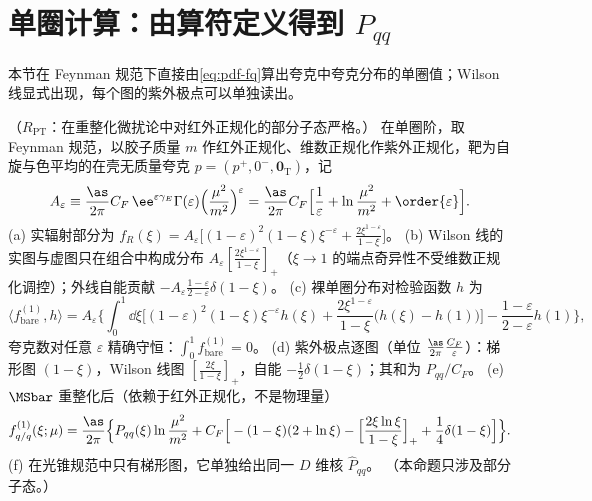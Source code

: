 \section{单圈计算：由算符定义得到 $P_{qq}$}\label{sec:pdf-oneloop}

本节在 Feynman 规范下直接由\cref{eq:pdf-fq}算出夸克中夸克分布的单圈值；Wilson 线显式出现，每个图的紫外极点可以单独读出。

\begin{proposition}\label{prop:pdf-pqq-operator}
（$R_{\mathrm{PT}}$：在重整化微扰论中对红外正规化的部分子态严格。）
在单圈阶，取 Feynman 规范，以胶子质量 $m$ 作红外正规化、维数正规化作紫外正规化，靶为自旋与色平均的在壳无质量夸克 $p=(p^+,0^-,\bm 0_{\mathrm T})$，记
\begin{equation}\label{eq:pdf-Aeps}
A_\varepsilon\equiv\frac{\as}{2\pi}C_F\,\ee^{\varepsilon\gamma_E}\Gamma(\varepsilon)\Big(\frac{\mu^2}{m^2}\Big)^{\varepsilon}=\frac{\as}{2\pi}C_F\Big[\frac1\varepsilon+\ln\frac{\mu^2}{m^2}+\order{\varepsilon}\Big].
\end{equation}
(a) 实辐射部分为 $f_R(\xi)=A_\varepsilon\big[(1-\varepsilon)^2(1-\xi)\xi^{-\varepsilon}+\frac{2\xi^{1-\varepsilon}}{1-\xi}\big]$。
(b) Wilson 线的实图与虚图只在组合中构成分布 $A_\varepsilon[\frac{2\xi^{1-\varepsilon}}{1-\xi}]_+$（$\xi\to1$ 的端点奇异性不受维数正规化调控）；外线自能贡献 $-A_\varepsilon\frac{1-\varepsilon}{2-\varepsilon}\delta(1-\xi)$。
(c) 裸单圈分布对检验函数 $h$ 为
\begin{equation}\label{eq:pdf-bare1}
\langle f^{(1)}_{\mathrm{bare}},h\rangle=A_\varepsilon\Big\{\int_0^1\!\dd\xi\Big[(1-\varepsilon)^2(1-\xi)\xi^{-\varepsilon}h(\xi)+\frac{2\xi^{1-\varepsilon}}{1-\xi}\big(h(\xi)-h(1)\big)\Big]-\frac{1-\varepsilon}{2-\varepsilon}h(1)\Big\},
\end{equation}
夸克数对任意 $\varepsilon$ 精确守恒：$\int_0^1f^{(1)}_{\mathrm{bare}}=0$。
(d) 紫外极点逐图（单位 $\frac{\as}{2\pi}\frac{C_F}{\varepsilon}$）：梯形图 $(1-\xi)$，Wilson 线图 $[\frac{2\xi}{1-\xi}]_+$，自能 $-\frac12\delta(1-\xi)$；其和为 $P_{qq}/C_F$。
(e) $\MSbar$ 重整化后（依赖于红外正规化，不是物理量）
\begin{equation}\label{eq:pdf-ren1}
f^{(1)}_{q/q}(\xi;\mu)=\frac{\as}{2\pi}\Big\{P_{qq}(\xi)\ln\frac{\mu^2}{m^2}+C_F\Big[-(1-\xi)(2+\ln\xi)-\Big[\frac{2\xi\ln\xi}{1-\xi}\Big]_++\frac14\delta(1-\xi)\Big]\Big\}.
\end{equation}
(f) 在光锥规范中只有梯形图，它单独给出同一 $D$ 维核 $\hat P_{qq}$。
（本命题只涉及部分子态。）
\end{proposition}


